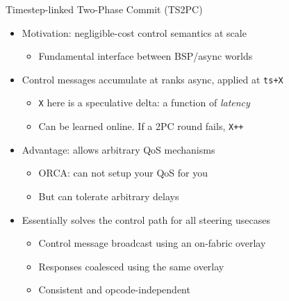 \documentclass[
  ignorenonframetext,
]{beamer}
\providecommand{\tightlist}{%
  \setlength{\itemsep}{0pt}\setlength{\parskip}{0pt}}\usepackage{longtable,booktabs,array}
\begin{document}
\begin{frame}[fragile]{Timestep-linked Two-Phase Commit (TS2PC)}
\label{timestep-linked-two-phase-commit-ts2pc}
\begin{itemize}
\tightlist
\item
  Motivation: negligible-cost control semantics at scale

  \begin{itemize}
  \tightlist
  \item
    Fundamental interface between BSP/async worlds
  \end{itemize}
\end{itemize}

\pause

\begin{itemize}
\tightlist
\item
  Control messages accumulate at ranks async, applied at \texttt{ts+X}

  \begin{itemize}
  \tightlist
  \item
    \texttt{X} here is a speculative delta: a function of \emph{latency}
  \item
    Can be learned online. If a 2PC round fails, \texttt{X++}
  \end{itemize}
\end{itemize}

\pause

\begin{itemize}
\tightlist
\item
  Advantage: allows arbitrary QoS mechanisms

  \begin{itemize}
  \tightlist
  \item
    ORCA: can not setup your QoS for you
  \item
    But can tolerate arbitrary delays
  \end{itemize}
\end{itemize}

\pause

\begin{itemize}
\tightlist
\item
  Essentially solves the control path for all steering usecases

  \begin{itemize}
  \tightlist
  \item
    Control message broadcast using an on-fabric overlay
  \item
    Responses coalesced using the same overlay
  \item
    Consistent and opcode-independent
  \end{itemize}
\end{itemize}
\end{frame}
\end{document}

